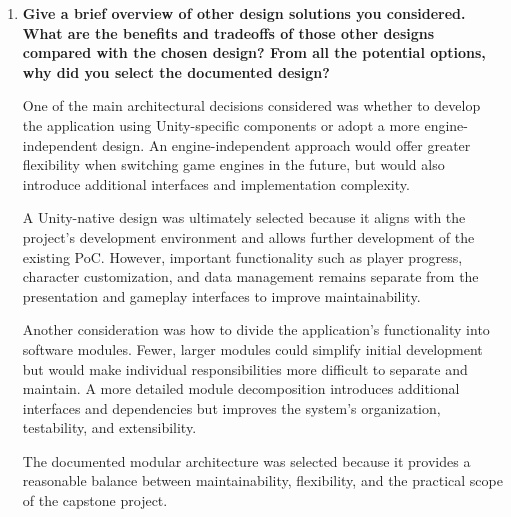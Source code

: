 \documentclass[10pt, titlepage]{article}
\begin{document}
\begin{enumerate}
    Furthermore, working more closely with ophthalmologists
    would help improve how accurately the game represents
    real-life eye examinations, including the equipment,
    procedures, instructions, and sensations children may
    experience. This would make the preparation activities
    more realistic while maintaining an age-appropriate
    and engaging experience.

    Additional development time could also be dedicated to
    improving the 3D environments, character animations,
    accessibility features, and overall gameplay experience.
    Testing on a wider range of mobile devices would further
    improve the application's reliability and usability.



    \item \textbf{Give a brief overview of other design solutions you
    considered. What are the benefits and tradeoffs of those other designs
    compared with the chosen design? From all the potential options, why did
    you select the documented design?}
    
    One of the main architectural decisions considered was
    whether to develop the application using Unity-specific
    components or adopt a more engine-independent design.
    An engine-independent approach would offer greater
    flexibility when switching game engines in the future,
    but would also introduce additional interfaces and
    implementation complexity.

    A Unity-native design was ultimately selected because
    it aligns with the project's development environment
    and allows further development of the existing PoC.
    However, important functionality such as player progress,
    character customization, and data management remains
    separate from the presentation and gameplay interfaces
    to improve maintainability.

    Another consideration was how to divide the application's
    functionality into software modules. Fewer, larger modules
    could simplify initial development but would make individual
    responsibilities more difficult to separate and maintain.
    A more detailed module decomposition introduces additional
    interfaces and dependencies but improves the system's
    organization, testability, and extensibility.

    The documented modular architecture was selected because
    it provides a reasonable balance between maintainability,
    flexibility, and the practical scope of the capstone project.



\end{enumerate}
\end{document}
